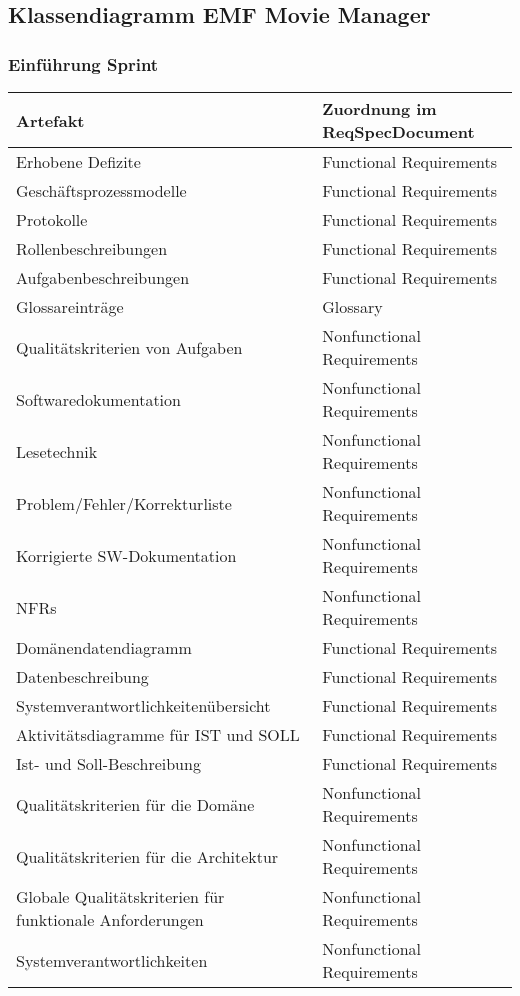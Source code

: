 \documentclass[ngerman]{scrartcl}
\title{\mytitle}
\author{\myauthor}
\newcommand{\blattnummer}{10}												%
\newcommand{\aufgabe}{1}
\newcommand{\f}{Functional Requirements}
\newcommand{\n}{Nonfunctional Requirements}
\newcommand{\g}{Glossary}
\begin{document}
	\setcounter{section}{\blattnummer}
	\setcounter{subsection}{\aufgabe-1}
	\subsection{Klassendiagramm EMF Movie Manager}
	\setcounter{subsubsection}{4}
	\subsubsection{Einführung Sprint}


	\begin{tiny}

	\begin{longtable}{|l|l|}
		\hline
		Artefakt & Zuordnung im ReqSpecDocument\\
		\hline
		\hline
		Erhobene Defizite & \f\\
		\hline
		Geschäftsprozessmodelle & \f\\
		\hline
		Protokolle & \f\\
		\hline
		Rollenbeschreibungen & \f\\
		\hline
		Aufgabenbeschreibungen & \f\\
		\hline
		Glossareinträge & \g\\
		\hline
		Qualitätskriterien von Aufgaben & \n\\
		\hline
		Softwaredokumentation & \n\\
		\hline
		Lesetechnik & \n\\
		\hline
		Problem/Fehler/Korrekturliste & \n\\
		\hline
		Korrigierte SW-Dokumentation & \n\\
		\hline
		NFRs & \n\\
		\hline
		Domänendatendiagramm & \f\\
		\hline
		Datenbeschreibung & \f\\
		\hline
		Systemverantwortlichkeitenübersicht & \f\\
		\hline
		Aktivitätsdiagramme für IST und SOLL & \f\\
		\hline
		Ist- und Soll-Beschreibung & \f\\
		\hline
		Qualitätskriterien für die Domäne & \n\\
		\hline
		Qualitätskriterien für die Architektur & \n\\
		\hline
		Globale Qualitätskriterien für funktionale Anforderungen & \n\\
		\hline
		Systemverantwortlichkeiten & \n\\

\end{longtable}
\end{tiny}
\end{document}
